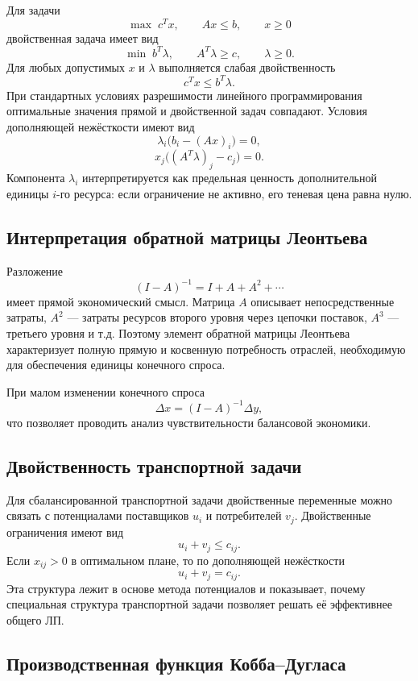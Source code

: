 Для задачи
\[
    \max\;c^Tx,
    \qquad Ax\le b,
    \qquad x\ge0
\]
двойственная задача имеет вид
\[
    \boxed{
    \min\;b^T\lambda,
    \qquad A^T\lambda\ge c,
    \qquad \lambda\ge0.
    }
\]
Для любых допустимых $x$ и $\lambda$ выполняется слабая двойственность
\[
    c^Tx\le b^T\lambda.
\]
При стандартных условиях разрешимости линейного программирования оптимальные
значения прямой и двойственной задач совпадают. Условия дополняющей нежёсткости
имеют вид
\[
    \lambda_i\bigl(b_i-(Ax)_i\bigr)=0,
\]
\[
    x_j\bigl((A^T\lambda)_j-c_j\bigr)=0.
\]
Компонента $\lambda_i$ интерпретируется как предельная ценность дополнительной
единицы $i$-го ресурса: если ограничение не активно, его теневая цена равна нулю.

\subsection{Интерпретация обратной матрицы Леонтьева}

Разложение
\[
    (I-A)^{-1}=I+A+A^2+\cdots
\]
имеет прямой экономический смысл. Матрица $A$ описывает непосредственные затраты,
$A^2$ --- затраты ресурсов второго уровня через цепочки поставок, $A^3$ ---
третьего уровня и т.д. Поэтому элемент обратной матрицы Леонтьева характеризует
полную прямую и косвенную потребность отраслей, необходимую для обеспечения
единицы конечного спроса.

При малом изменении конечного спроса
\[
    \Delta x=(I-A)^{-1}\Delta y,
\]
что позволяет проводить анализ чувствительности балансовой экономики.

\subsection{Двойственность транспортной задачи}

Для сбалансированной транспортной задачи двойственные переменные можно связать
с потенциалами поставщиков $u_i$ и потребителей $v_j$. Двойственные ограничения
имеют вид
\[
    u_i+v_j\le c_{ij}.
\]
Если $x_{ij}>0$ в оптимальном плане, то по дополняющей нежёсткости
\[
    u_i+v_j=c_{ij}.
\]
Эта структура лежит в основе метода потенциалов и показывает, почему специальная
структура транспортной задачи позволяет решать её эффективнее общего ЛП.

\subsection{Производственная функция Кобба--Дугласа}

